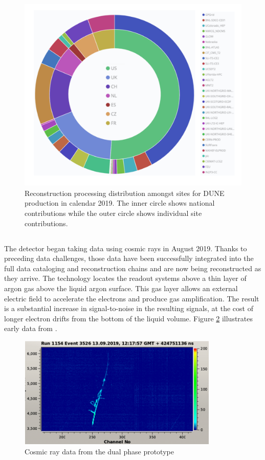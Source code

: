 \begin{figure}
\begin{center}
\includegraphics[height=0.65\textwidth]{graphics/IntroFigures/Fig_8.pdf}
\caption{Reconstruction processing distribution amongst sites for DUNE production in calendar 2019.  The inner circle shows national contributions while the outer circle shows individual site contributions.}
\label{sites}
\end{center}
\end{figure}

\subsection{}

The  detector began taking data using cosmic rays in August 2019.  Thanks to preceding data challenges, those data have been successfully integrated into the full data cataloging and reconstruction chains and are now being reconstructed as they arrive.   The  technology locates the readout systems above a thin layer of argon gas above the liquid argon surface.  This gas layer allows an external electric field to accelerate the electrons and produce gas amplification.  The result is a substantial increase in signal-to-noise in the resulting signals, at the cost of longer electron drifts from the bottom of the liquid volume.  Figure \ref{dpevent} illustrates early data from . 

\begin{figure}
\centering
\includegraphics[width=0.85\textwidth]{graphics/IntroFigures/Fig_09_protodune-dp-event.png}
\caption {Cosmic ray data from the dual phase prototype}
\label{dpevent}
\end{figure}


